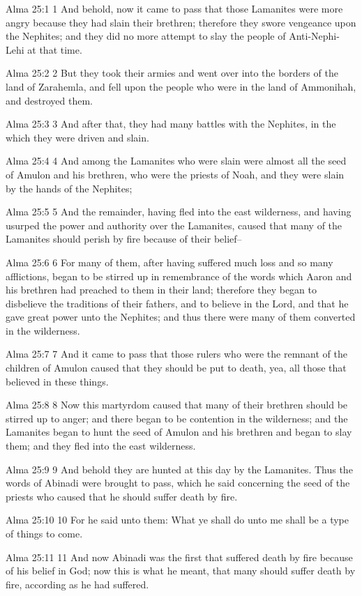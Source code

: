 Alma 25:1
 1 And behold, now it came to pass that those Lamanites were more
angry because they had slain their brethren; therefore they swore
vengeance upon the Nephites; and they did no more attempt to slay
the people of Anti-Nephi-Lehi at that time.

Alma 25:2
 2 But they took their armies and went over into the borders of
the land of Zarahemla, and fell upon the people who were in the
land of Ammonihah, and destroyed them.

Alma 25:3
 3 And after that, they had many battles with the Nephites, in
the which they were driven and slain.

Alma 25:4
 4 And among the Lamanites who were slain were almost all the
seed of Amulon and his brethren, who were the priests of Noah,
and they were slain by the hands of the Nephites;

Alma 25:5
 5 And the remainder, having fled into the east wilderness, and
having usurped the power and authority over the Lamanites, caused
that many of the Lamanites should perish by fire because of their
belief--

Alma 25:6
 6 For many of them, after having suffered much loss and so many
afflictions, began to be stirred up in remembrance of the words
which Aaron and his brethren had preached to them in their land;
therefore they began to disbelieve the traditions of their
fathers, and to believe in the Lord, and that he gave great power
unto the Nephites; and thus there were many of them converted in
the wilderness.

Alma 25:7
 7 And it came to pass that those rulers who were the remnant of
the children of Amulon caused that they should be put to death,
yea, all those that believed in these things.

Alma 25:8
 8 Now this martyrdom caused that many of their brethren should
be stirred up to anger; and there began to be contention in the
wilderness; and the Lamanites began to hunt the seed of Amulon
and his brethren and began to slay them; and they fled into the
east wilderness.

Alma 25:9
 9 And behold they are hunted at this day by the Lamanites. Thus
the words of Abinadi were brought to pass, which he said
concerning the seed of the priests who caused that he should
suffer death by fire.

Alma 25:10
 10 For he said unto them: What ye shall do unto me shall be a
type of things to come.

Alma 25:11
 11 And now Abinadi was the first that suffered death by fire
because of his belief in God; now this is what he meant, that
many should suffer death by fire, according as he had suffered.

